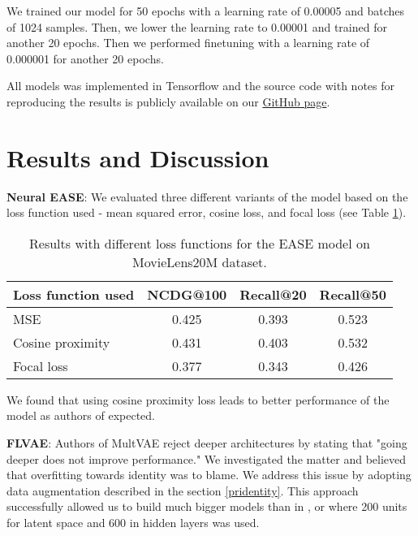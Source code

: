 \documentclass[conference]{IEEEtran}
\begin{document}
        We trained our model for 50 epochs with a learning rate of 0.00005 and batches of 1024 samples. Then, we lower the learning rate to 0.00001 and trained for another 20 epochs. Then we performed finetuning with a learning rate of 0.000001 for another 20 epochs.
        
All models was implemented in Tensorflow\cite{tensorflow2015-whitepaper} and the source code with notes for reproducing the results is publicly available on our \href{https://github.com/zombak79/vasp}{GitHub page}.
    
\section{Results and Discussion}\label{results}
      
   
    \textbf{Neural EASE}: We evaluated three different variants of the model based on the loss function used - mean squared error, cosine loss, and focal loss (see Table \ref{tab:2}).
    
    \begin{table}[h]\label{tab:2}\caption{Results with different loss functions for the EASE model on MovieLens20M dataset.}
        \centering
        \begin{tabular}{@{}llll@{}}
            \toprule
            Loss function used & NCDG@100 & Recall@20 & Recall@50 \\ 
            \midrule
            MSE                & \multicolumn{1}{c}{0.425} & \multicolumn{1}{c}{0.393} & \multicolumn{1}{c}{0.523}           \\
            Cosine proximity & \multicolumn{1}{c}{0.431} & \multicolumn{1}{c}{0.403} & \multicolumn{1}{c}{0.532} \\
            Focal loss         &   \multicolumn{1}{c}{0.377} & \multicolumn{1}{c}{0.343} & \multicolumn{1}{c}{0.426}             \\ 
            \bottomrule
        \end{tabular}
        \centering
    \end{table}
    
    \noindent
    We found that using cosine proximity loss leads to better performance of the model as authors of \cite{Steck2019} expected.
    
    \textbf{FLVAE}: Authors of MultVAE reject deeper architectures by stating that "going deeper does not improve performance." We investigated the matter and believed that overfitting towards identity was to blame. We address this issue by adopting data augmentation described in the section \ref{pridentity}. This approach successfully allowed us to build much bigger models than in \cite{Liang2018}, \cite{Shenbin2020} or \cite{Kim2019} where 200 units for latent space and 600 in hidden layers was used.
    
\end{document}

